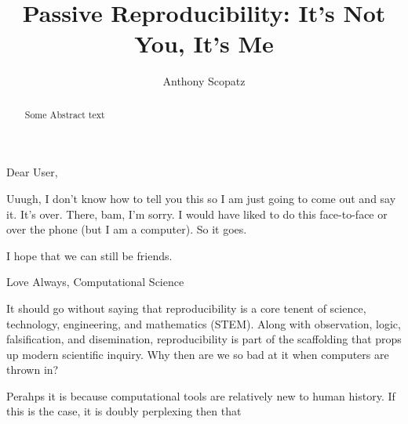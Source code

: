 \documentclass[final,10pt]{elsarticle}
\makeatletter
\newcommand{\emaila}{scopatz@flash.uchicago.edu}
\makeatother
\begin{document}
\begin{frontmatter}



\title{Passive Reproducibility: It's Not You, It's Me}




\author[fc]{Anthony Scopatz} 

\address[fc]{Flash Center for Computational Science, University of Chicago}


\begin{abstract}
Some Abstract text
\end{abstract}


\end{frontmatter}

Dear User, 

Uuugh, I don't know how to tell you this so I am just going to come out and
say it.  It's over.  There, bam, I'm sorry.  I would have liked to do this 
face-to-face or over the phone (but I am a computer).  So it goes.


I hope that we can still be friends.

Love Always, Computational Science


It should go without saying that reproducibility is a core tenent of science, 
technology, engineering, and mathematics (STEM).  Along with observation, logic, 
falsification, and disemination, reproducibility is part of the scaffolding that 
props up modern scientific inquiry.  Why then are we so bad at it when computers
are thrown in?

Perahps it is because computational tools are relatively new to human history.  
If this is the case, it is doubly perplexing then that 


%
\end{document}
